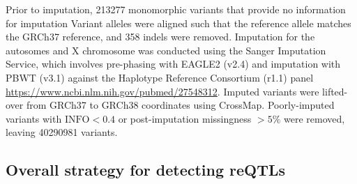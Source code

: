 Prior to imputation, 213277 monomorphic variants that provide no information for imputation
Variant alleles were aligned such that the reference allele matches the GRCh37 reference, and 358 indels were removed.
Imputation for the autosomes and X chromosome was conducted using the Sanger Imputation Service, 
which involves pre-phasing with EAGLE2 (v2.4) and imputation with PBWT (v3.1) against the Haplotype Reference Consortium (r1.1) panel \url{https://www.ncbi.nlm.nih.gov/pubmed/27548312}.
Imputed variants were lifted-over from GRCh37 to GRCh38 coordinates using CrossMap.
Poorly-imputed variants with $\text{INFO} < 0.4$ or post-imputation missingness $> 5\%$ were removed, leaving 40290981 variants.

\subsection{Overall strategy for detecting reQTLs}

